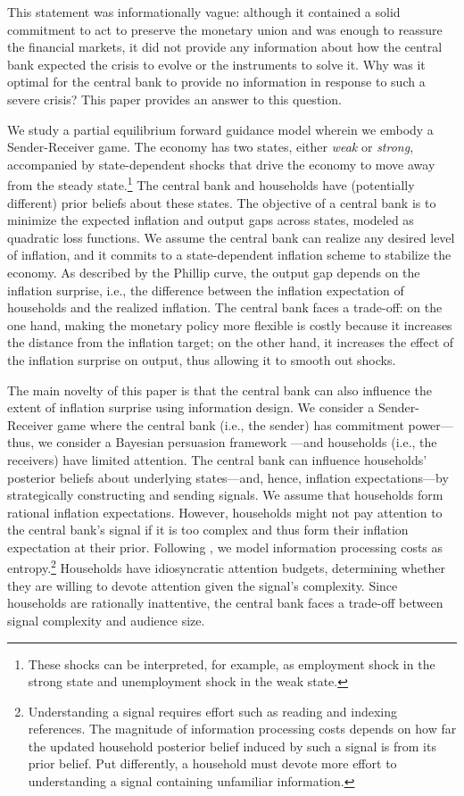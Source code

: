 \documentclass[12pt,a4paper]{article}
\begin{document}
This statement was informationally vague: although it contained a solid commitment to act to preserve the monetary union and was enough to reassure the financial markets, it did not provide any information about how the central bank expected the crisis to evolve or the instruments to solve it. Why was it optimal for the central bank to provide no information in response to such a severe crisis? This paper provides an answer to this question.

We study a partial equilibrium forward guidance model wherein we embody a Sender-Receiver game. 
The economy has two states, either \textit{weak} or \textit{strong}, accompanied by state-dependent shocks that drive the economy to move away from the steady state.\footnote{These shocks can be interpreted, for example, as employment shock in the strong state and unemployment shock in the weak state.} The central bank and households have (potentially different) prior beliefs about these states. The objective of a central bank is to minimize the expected inflation and output gaps across states, modeled as quadratic loss functions. We assume the central bank can realize any desired level of inflation, and it commits to a state-dependent inflation scheme to stabilize the economy. As described by the Phillip curve, the output gap depends on the inflation surprise, i.e., the difference between the inflation expectation of households and the realized inflation. The central bank faces a trade-off: on the one hand, making the monetary policy more flexible is costly because it increases the distance from the inflation target; on the other hand, it increases the effect of the inflation surprise on output, thus allowing it to smooth out shocks. 

The main novelty of this paper is that the central bank can also influence the extent of inflation surprise using information design. We consider a Sender-Receiver game where the central bank (i.e., the sender) has commitment power---thus, we consider a Bayesian persuasion framework \citep{KG2011}---and households (i.e., the receivers) have limited attention. The central bank can influence households' posterior beliefs about underlying states---and, hence, inflation expectations---by strategically constructing and sending signals. 
We assume that households form rational inflation expectations. However, households might not pay attention to the central bank's signal if it is too complex and thus form their inflation expectation at their prior. Following \cite{Sims2003}, we model information processing costs as entropy.\footnote{Understanding a signal requires effort such as reading and indexing references. The magnitude of information processing costs depends on how far the updated household posterior belief induced by such a signal is from its prior belief. Put differently, a household must devote more effort to understanding a signal containing unfamiliar information.} Households have idiosyncratic attention budgets, determining whether they are willing to devote attention given the signal's complexity. Since households are rationally inattentive, the central bank faces a trade-off between signal complexity and audience size. 
\end{document}
